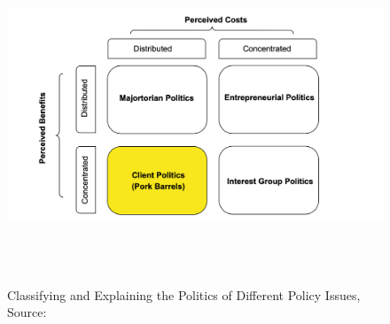 \begin{figure}[ht]
    \centering
    \includegraphics[width = 17cm, height=10cm]{03-Chapter-Three/image/porktype.png}
    \caption{Classifying and Explaining the Politics of Different Policy Issues, Source: \citet{Wilson2001}}
    \label{fig:type}
\end{figure}
